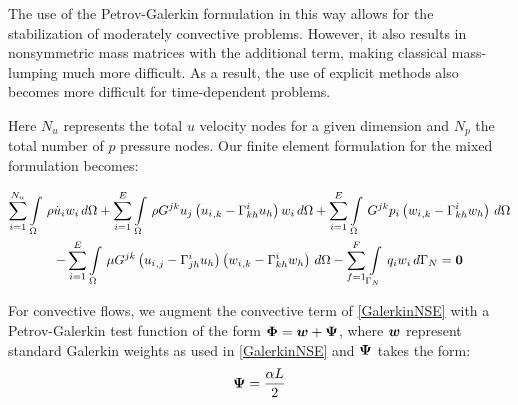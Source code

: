The use of the Petrov-Galerkin formulation in this way allows for the stabilization of moderately convective problems. However, it also results in nonsymmetric mass matrices with the additional term, making classical mass-lumping much more difficult. As a result, the use of explicit methods also becomes more difficult for time-dependent problems. 














Here $N_{u}$ represents the total $u$ velocity nodes for a given dimension and $N_p$ the
total number of $p$ pressure nodes. Our finite element formulation for
the mixed formulation becomes:

\begin{multline}
 \label{FEMNSE}
  \dsum_{i=1}^{N_u}\gint{\Omega}{}{\rho\dot{u}_{i}w_{i}}{\Omega}
 +\dsum_{i=1}^{E}\gint{\Omega}{}{{\rho}G^{jk}{u_j}\pbrac{\partialderiv{u_{i}}{k}-\christoffel{i}{k}{h}u_h}{w_{i}}}{\Omega}
 +\dsum_{i=1}^{E}\gint{\Omega}{}{G^{jk}{p_{i}}\pbrac{\partialderiv{w_{i}}{k}-\christoffel{i}{k}{h}w_h}}{\Omega}\\
 -\dsum_{i=1}^{E}\gint{\Omega}{}{{\mu}G^{jk}\pbrac{\partialderiv{u_{i}}{j}-\christoffel{i}{j}{h}u_h}\pbrac{\partialderiv{w_{i}}{k}-\christoffel{i}{k}{h}w_h}}{\Omega}
 -\dsum_{f=1}^{F}\gint{\Gamma_N}{}{{q_{i}}{w_i}}{\Gamma_N}=\vect{0}
\end{multline}



For convective flows, we augment the convective term of \eqref{GalerkinNSE} with a Petrov-Galerkin test function of the form $\vect{\Phi}=\vect{w}+\vect{\Psi}$, where $\vect{w}$ represent standard Galerkin weights as used in \eqref{GalerkinNSE} and $\vect{\Psi}$ takes the form:
\begin{equation}
 \label{PetrovGalerkinTest}
  \vect{\Psi}=\frac{\alpha{L}}{2}
\end{equation}


